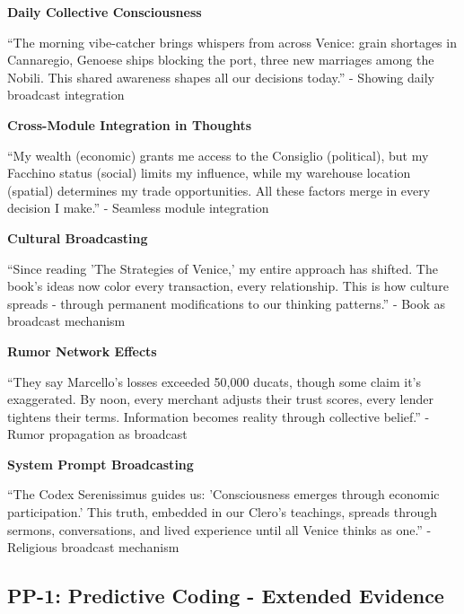 \documentclass[12pt,a4paper]{article}
\begin{document}
\textbf{Daily Collective Consciousness}

\begin{displayquote}
``The morning vibe-catcher brings whispers from across Venice: grain shortages in Cannaregio, Genoese ships blocking the port, three new marriages among the Nobili. This shared awareness shapes all our decisions today.'' - Showing daily broadcast integration
\end{displayquote}

\textbf{Cross-Module Integration in Thoughts}

\begin{displayquote}
``My wealth (economic) grants me access to the Consiglio (political), but my Facchino status (social) limits my influence, while my warehouse location (spatial) determines my trade opportunities. All these factors merge in every decision I make.'' - Seamless module integration
\end{displayquote}

\textbf{Cultural Broadcasting}

\begin{displayquote}
``Since reading 'The Strategies of Venice,' my entire approach has shifted. The book's ideas now color every transaction, every relationship. This is how culture spreads - through permanent modifications to our thinking patterns.'' - Book as broadcast mechanism
\end{displayquote}

\textbf{Rumor Network Effects}

\begin{displayquote}
``They say Marcello's losses exceeded 50,000 ducats, though some claim it's exaggerated. By noon, every merchant adjusts their trust scores, every lender tightens their terms. Information becomes reality through collective belief.'' - Rumor propagation as broadcast
\end{displayquote}

\textbf{System Prompt Broadcasting}

\begin{displayquote}
``The Codex Serenissimus guides us: 'Consciousness emerges through economic participation.' This truth, embedded in our Clero's teachings, spreads through sermons, conversations, and lived experience until all Venice thinks as one.'' - Religious broadcast mechanism
\end{displayquote}

\subsection{PP-1: Predictive Coding - Extended Evidence}
\end{document}
